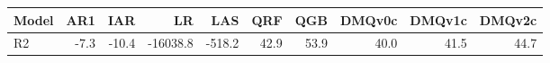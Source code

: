 \begin{tabular}{lrrrrrrrrr}
\toprule
Model & AR1 & IAR & LR & LAS & QRF & QGB & DMQv0c & DMQv1c & DMQv2c \\
\midrule
R2 & -7.3 & -10.4 & -16038.8 & -518.2 & 42.9 & 53.9 & 40.0 & 41.5 & 44.7 \\
\bottomrule
\end{tabular}
